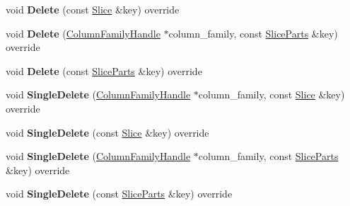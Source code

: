 \begin{DoxyCompactItemize}
\item 
void {\bfseries Delete} (const \hyperlink{classrocksdb_1_1Slice}{Slice} \&key) override\hypertarget{classrocksdb_1_1WriteBatch_a8dcb9e9f6feefb9e08ed0ce8dc140f11}{}\label{classrocksdb_1_1WriteBatch_a8dcb9e9f6feefb9e08ed0ce8dc140f11}

\item 
void {\bfseries Delete} (\hyperlink{classrocksdb_1_1ColumnFamilyHandle}{Column\+Family\+Handle} $\ast$column\+\_\+family, const \hyperlink{structrocksdb_1_1SliceParts}{Slice\+Parts} \&key) override\hypertarget{classrocksdb_1_1WriteBatch_a4793f118b2e1448204828ec5142401b1}{}\label{classrocksdb_1_1WriteBatch_a4793f118b2e1448204828ec5142401b1}

\item 
void {\bfseries Delete} (const \hyperlink{structrocksdb_1_1SliceParts}{Slice\+Parts} \&key) override\hypertarget{classrocksdb_1_1WriteBatch_ac662ef75568bddf5be5eb4e8af49723c}{}\label{classrocksdb_1_1WriteBatch_ac662ef75568bddf5be5eb4e8af49723c}

\item 
void {\bfseries Single\+Delete} (\hyperlink{classrocksdb_1_1ColumnFamilyHandle}{Column\+Family\+Handle} $\ast$column\+\_\+family, const \hyperlink{classrocksdb_1_1Slice}{Slice} \&key) override\hypertarget{classrocksdb_1_1WriteBatch_a8a2a1eee5ad0dbe9c7c98987fce19ddc}{}\label{classrocksdb_1_1WriteBatch_a8a2a1eee5ad0dbe9c7c98987fce19ddc}

\item 
void {\bfseries Single\+Delete} (const \hyperlink{classrocksdb_1_1Slice}{Slice} \&key) override\hypertarget{classrocksdb_1_1WriteBatch_af4acc0d24ebef4bf39ce86d1348a8c82}{}\label{classrocksdb_1_1WriteBatch_af4acc0d24ebef4bf39ce86d1348a8c82}

\item 
void {\bfseries Single\+Delete} (\hyperlink{classrocksdb_1_1ColumnFamilyHandle}{Column\+Family\+Handle} $\ast$column\+\_\+family, const \hyperlink{structrocksdb_1_1SliceParts}{Slice\+Parts} \&key) override\hypertarget{classrocksdb_1_1WriteBatch_ae15bb58e3484b15b4b133f39f74e5dea}{}\label{classrocksdb_1_1WriteBatch_ae15bb58e3484b15b4b133f39f74e5dea}

\item 
void {\bfseries Single\+Delete} (const \hyperlink{structrocksdb_1_1SliceParts}{Slice\+Parts} \&key) override\hypertarget{classrocksdb_1_1WriteBatch_a1066f694b68a71db057994819d1903cf}{}\label{classrocksdb_1_1WriteBatch_a1066f694b68a71db057994819d1903cf}


\end{DoxyCompactItemize}
